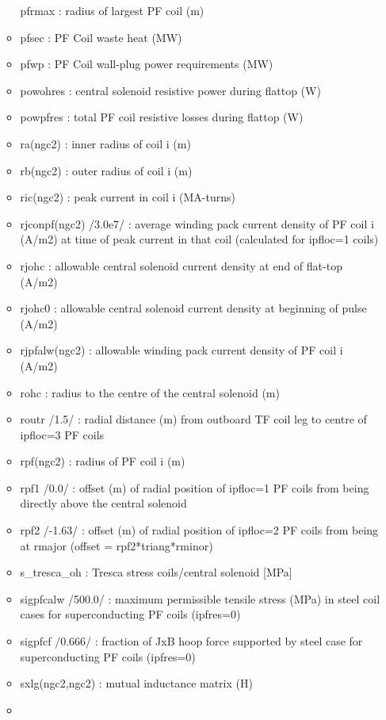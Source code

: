 \documentclass[
]{article}
\begin{document}
\begin{itemize}
\begin{itemize}
    pfrmax : radius of largest PF coil (m)
  \item
    pfsec : PF Coil waste heat (MW)
  \item
    pfwp : PF Coil wall-plug power requirements (MW)
  \item
    powohres : central solenoid resistive power during flattop (W)
  \item
    powpfres : total PF coil resistive losses during flattop (W)
  \item
    ra(ngc2) : inner radius of coil i (m)
  \item
    rb(ngc2) : outer radius of coil i (m)
  \item
    ric(ngc2) : peak current in coil i (MA-turns)
  \item
    rjconpf(ngc2) /3.0e7/ : average winding pack current density of PF
    coil i (A/m2) at time of peak current in that coil (calculated for
    ipfloc=1 coils)
  \item
    rjohc : allowable central solenoid current density at end of
    flat-top (A/m2)
  \item
    rjohc0 : allowable central solenoid current density at beginning of
    pulse (A/m2)
  \item
    rjpfalw(ngc2) : allowable winding pack current density of PF coil i
    (A/m2)
  \item
    rohc : radius to the centre of the central solenoid (m)
  \item
    routr /1.5/ : radial distance (m) from outboard TF coil leg to
    centre of ipfloc=3 PF coils
  \item
    rpf(ngc2) : radius of PF coil i (m)
  \item
    rpf1 /0.0/ : offset (m) of radial position of ipfloc=1 PF coils from
    being directly above the central solenoid
  \item
    rpf2 /-1.63/ : offset (m) of radial position of ipfloc=2 PF coils
    from being at rmajor (offset = rpf2*triang*rminor)
  \item
    s\_tresca\_oh : Tresca stress coils/central solenoid {[}MPa{]}
  \item
    sigpfcalw /500.0/ : maximum permissible tensile stress (MPa) in
    steel coil cases for superconducting PF coils (ipfres=0)
  \item
    sigpfcf /0.666/ : fraction of JxB hoop force supported by steel case
    for superconducting PF coils (ipfres=0)
  \item
    sxlg(ngc2,ngc2) : mutual inductance matrix (H)
  \item

\end{itemize}
\end{itemize}
\end{document}
